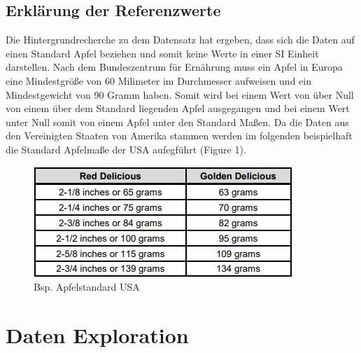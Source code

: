 \documentclass{article}
\begin{document}
\subsection{Erklärung der Referenzwerte}
Die Hintergrundrecherche zu dem Datensatz hat ergeben, dass sich die Daten auf einen Standard Apfel beziehen und somit keine Werte in einer SI Einheit darstellen. Nach dem Bundeszentrum für Ernährung muss ein Apfel in Europa eine Mindestgröße von 60 Milimeter im Durchmesser aufweisen und ein Mindestgewicht von 90 Gramm haben. Somit wird bei einem Wert von über Null von einem über dem Standard liegenden Apfel ausgegangen und bei einem Wert unter Null somit von einem Apfel unter den Standard Maßen. Da die Daten aus den Vereinigten Staaten von Amerika stammen werden im folgenden beispielhaft die Standard Apfelmaße der USA aufegführt (Figure 1).
\begin{figure}[h]
\centering
\includegraphics[scale=.8]{"../images/AppleStandard.png"}
\caption{Bsp. Apfelstandard USA}
\label{fig:meine-grafik}
\end{figure}


\section{Daten Exploration}
\end{document}
